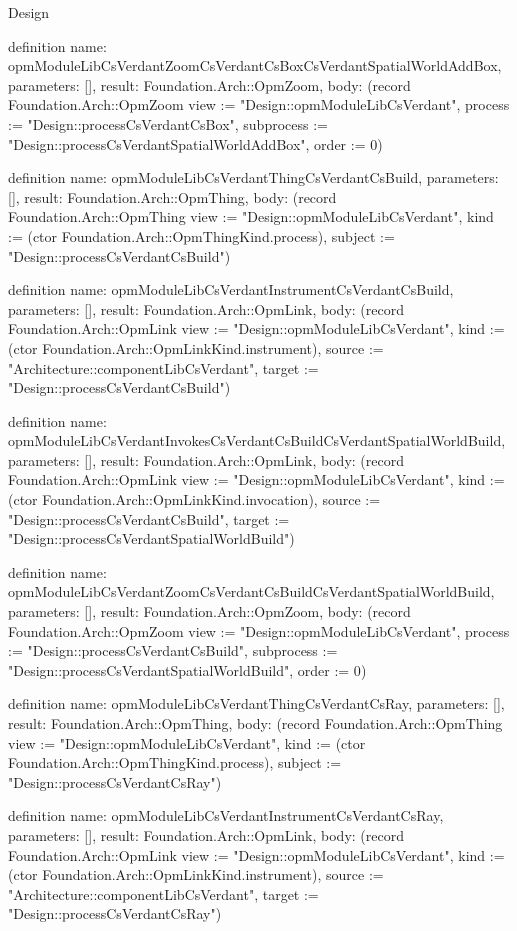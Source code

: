 \begin{lexlean}{Design}
\begin{semanticmodule}
definition{
  name: opmModuleLibCsVerdantZoomCsVerdantCsBoxCsVerdantSpatialWorldAddBox,
  parameters: [],
  result: Foundation.Arch::OpmZoom,
  body: (record Foundation.Arch::OpmZoom {view := "Design::opmModuleLibCsVerdant", process := "Design::processCsVerdantCsBox", subprocess := "Design::processCsVerdantSpatialWorldAddBox", order := 0})
}

definition{
  name: opmModuleLibCsVerdantThingCsVerdantCsBuild,
  parameters: [],
  result: Foundation.Arch::OpmThing,
  body: (record Foundation.Arch::OpmThing {view := "Design::opmModuleLibCsVerdant", kind := (ctor Foundation.Arch::OpmThingKind.process), subject := "Design::processCsVerdantCsBuild"})
}

definition{
  name: opmModuleLibCsVerdantInstrumentCsVerdantCsBuild,
  parameters: [],
  result: Foundation.Arch::OpmLink,
  body: (record Foundation.Arch::OpmLink {view := "Design::opmModuleLibCsVerdant", kind := (ctor Foundation.Arch::OpmLinkKind.instrument), source := "Architecture::componentLibCsVerdant", target := "Design::processCsVerdantCsBuild"})
}

definition{
  name: opmModuleLibCsVerdantInvokesCsVerdantCsBuildCsVerdantSpatialWorldBuild,
  parameters: [],
  result: Foundation.Arch::OpmLink,
  body: (record Foundation.Arch::OpmLink {view := "Design::opmModuleLibCsVerdant", kind := (ctor Foundation.Arch::OpmLinkKind.invocation), source := "Design::processCsVerdantCsBuild", target := "Design::processCsVerdantSpatialWorldBuild"})
}

definition{
  name: opmModuleLibCsVerdantZoomCsVerdantCsBuildCsVerdantSpatialWorldBuild,
  parameters: [],
  result: Foundation.Arch::OpmZoom,
  body: (record Foundation.Arch::OpmZoom {view := "Design::opmModuleLibCsVerdant", process := "Design::processCsVerdantCsBuild", subprocess := "Design::processCsVerdantSpatialWorldBuild", order := 0})
}

definition{
  name: opmModuleLibCsVerdantThingCsVerdantCsRay,
  parameters: [],
  result: Foundation.Arch::OpmThing,
  body: (record Foundation.Arch::OpmThing {view := "Design::opmModuleLibCsVerdant", kind := (ctor Foundation.Arch::OpmThingKind.process), subject := "Design::processCsVerdantCsRay"})
}

definition{
  name: opmModuleLibCsVerdantInstrumentCsVerdantCsRay,
  parameters: [],
  result: Foundation.Arch::OpmLink,
  body: (record Foundation.Arch::OpmLink {view := "Design::opmModuleLibCsVerdant", kind := (ctor Foundation.Arch::OpmLinkKind.instrument), source := "Architecture::componentLibCsVerdant", target := "Design::processCsVerdantCsRay"})
}


\end{semanticmodule}
\end{lexlean}
